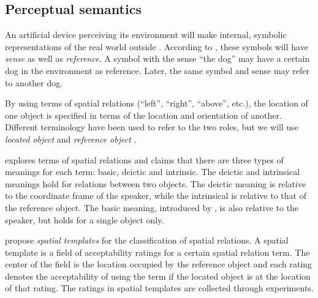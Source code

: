 \subsection{Perceptual semantics}

An artificial device perceiving its environment will make internal, symbolic representations of the real world outside \citep{PustejovskyPerceptualsemanticsconstruction1990}.
According to \cite{FregeUberSinnUnd1892}, these symbols will have \textit{sense} as well as \textit{reference}.
A symbol with the sense ``the dog'' may have a certain dog in the environment as reference.
Later, the same symbol and sense may refer to another dog.

By using terms of spatial relations (``left'', ``right'', ``above'', etc.), the location of one object is specified in terms of the location and orientation of another.
Different terminology have been used to refer to the two roles, but we will use \textit{located object} and \textit{reference object} \citep{DobnikModellinglanguageaction2012}.

\cite{Garnhamunifiedtheorymeaning1989} explores terms of spatial relations and claims that there are three types of meanings for each term: basic, deictic and intrinsic.
The deictic and intrinsical meanings hold for relations between two objects.
The deictic meaning is relative to the coordinate frame of the speaker, while the intrinsical is relative to that of the reference object.
The basic meaning, introduced by \citeauthor{Garnhamunifiedtheorymeaning1989}, is also relative to the speaker, but holds for a single object only.


\cite{LoganComputationalAnalysisApprehension1996} propose \textit{spatial templates} for the classification of spatial relations.
A spatial template is a field of acceptability ratings for a certain spatial relation term.
The center of the field is the location occupied by the reference object and each rating denotes the acceptability of using the term if the located object is at the location of that rating.
The ratings in spatial templates are collected through experiments.


